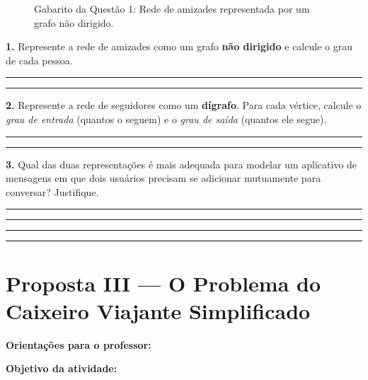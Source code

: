 \documentclass[
  12pt,
  oneside,
  a4paper,
  english,
  brazilian
  ]{abntex2}
\theoremstyle{definition}
\def\vspace#1{ }%
\def\bfseries{}%
\begin{document}
\begin{apendicesenv}
\begin{figure}[htbp]
    \caption{Gabarito da Questão 1: Rede de amizades representada por um grafo não dirigido.}
    \label{fig:rede_amizades}
\end{figure}
\vspace{0.5cm}

\textbf{1.} Represente a rede de amizades como um grafo \textbf{não dirigido} e calcule o grau de cada pessoa.

\vspace{5cm}
\noindent\rule{\textwidth}{0.4pt}\vspace{0.3cm}
\noindent\rule{\textwidth}{0.4pt}

\vspace{0.5cm}
\textbf{2.} Represente a rede de seguidores como um \textbf{dígrafo}. Para cada vértice, calcule o \emph{grau de entrada} (quantos o seguem) e o \emph{grau de saída} (quantos ele segue).

\vspace{6cm}
\noindent\rule{\textwidth}{0.4pt}\vspace{0.3cm}
\noindent\rule{\textwidth}{0.4pt}

\vspace{0.5cm}
\textbf{3.} Qual das duas representações é mais adequada para modelar um aplicativo de mensagens em que dois usuários precisam se adicionar mutuamente para conversar? Justifique.

\vspace{0.3cm}
\noindent\rule{\textwidth}{0.4pt}\vspace{0.3cm}
\noindent\rule{\textwidth}{0.4pt}\vspace{0.3cm}
\noindent\rule{\textwidth}{0.4pt}\vspace{0.3cm}
\noindent\rule{\textwidth}{0.4pt}


\chapter{Proposta III --- O Problema do Caixeiro Viajante Simplificado}
\label{apendice:caixeiro}

\textbf{Orientações para o professor:}

\textbf{Objetivo da atividade:}


\end{apendicesenv}
\end{document}
